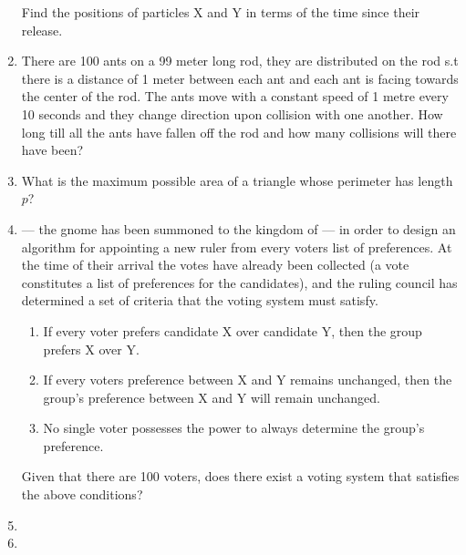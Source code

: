 \documentclass{article}
\begin{document}
\begin{enumerate}
    Find the positions of particles X and Y in terms of the time since their release.
    
    \item
    There are 100 ants on a 99 meter long rod, they are distributed on the rod s.t there is a distance of 1 meter between each ant and each ant is facing towards the center of the rod. The ants move with a constant speed of 1 metre every 10 seconds and they change direction upon collision with one another. How long till all the ants have fallen off the rod and how many collisions will there have been?
    
    \item
    What is the maximum possible area of a triangle whose perimeter has length $p$?
    
    \item
    --- the gnome has been summoned to the kingdom of --- in order to design an algorithm for appointing a new ruler from every voters list of preferences. At the time of their arrival the votes have already been collected (a vote constitutes a list of preferences for the candidates), and the ruling council has determined a set of criteria that the voting system must satisfy.
    \begin{enumerate}
        \item If every voter prefers candidate X over candidate Y, then the group prefers X over Y.
        \item If every voters preference between X and Y remains unchanged, then the group's preference between X and Y will remain unchanged.
        \item No single voter possesses the power to always determine the group's preference.
    \end{enumerate}
    Given that there are 100 voters, does there exist a voting system that satisfies the above conditions?
    
    \item
    
    \item

\end{enumerate}
\end{document}
